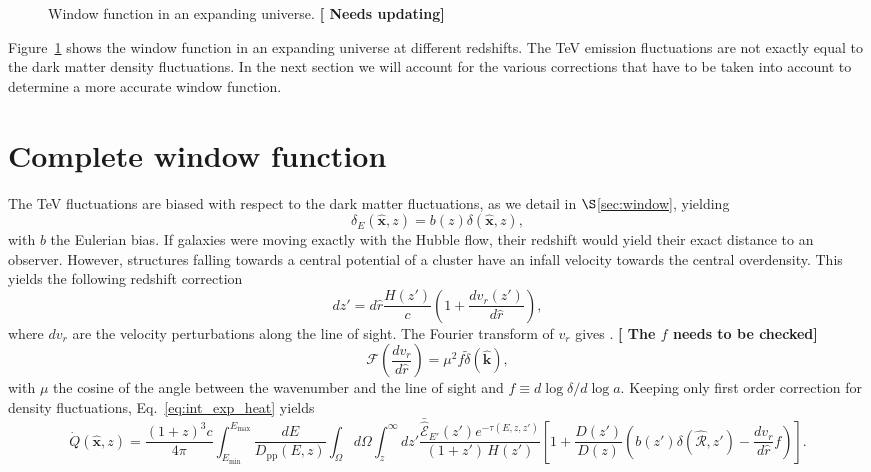 \documentclass[numberedappendix]{emulateapj}
\newcommand\ALc[1]{{\color{red} \bf #1}} %
\begin{document}
{\begin{figure}[h]
\caption{Window function in an expanding universe.\ALc{[{ Needs updating}]}}
\label{fig:window_nobiases}
\end{figure}
Figure~\ref{fig:window_nobiases} shows the window function in an expanding universe at different redshifts. %
The TeV emission fluctuations are not exactly equal to the dark matter density fluctuations. In the next section we will account for the various corrections that have to be taken into account to determine a more accurate window function.


\section{Complete window function}
\label{sec:window_complete}
The TeV fluctuations are biased with respect to the dark matter fluctuations, as we detail in $\S$\ref{sec:window}, yielding
\begin{equation}
\delta_E(\mathbf{\hat{x}},z)=b(z)\delta(\mathbf{\hat{x}},z),
\label{eq:bias}
\end{equation}
with $b$ the Eulerian bias. If galaxies were moving exactly with the Hubble flow, their redshift would yield their exact distance to an observer. However, structures falling towards a central potential of a cluster have an infall velocity towards the central overdensity. This yields the following redshift correction
\begin{equation}
\label{eq:vel_perturb}
dz'=d\hat r\frac{H(z')}{c}\left(1+\frac{dv_r(z')}{d\hat r}\right),
\end{equation}
where $dv_r$ are the velocity perturbations along the line of sight. The Fourier transform of $v_r$ gives \citep{1987MNRAS.227....1K}.\ALc{[{ The $f$ needs to be checked}]}
\begin{equation}
\label{eq:kaiser2}
\mathcal{F}\left(\frac{dv_r}{d\hat r}\right)=\mu^2 f \tilde{\delta}(\mathbf{\hat k}),
\end{equation}
with $\mu$ the cosine of the angle between the wavenumber and the line of sight and $f\equiv d\log\delta/d\log a$. Keeping only first order correction for density fluctuations, Eq.~\eqref{eq:int_exp_heat} yields
\begin{equation}
\label{eq:mean_heat0}
\dot{Q}(\mathbf{\hat{x}},z)=\frac{(1+z)^3c}{4\pi }\int_{E_{\mathrm{min}}}^{E_{\mathrm{max}}}\frac{dE}{D_{\mathrm{pp}}(E,z)}\int_{\Omega}d\Omega\int_z^{\infty} dz'\frac{\mathcal{\bar{\hat E}}_{E'}(z')e^{-\tau(E,z,z')}}{(1+z')\,H(z')}\left[1+\frac{D(z')}{D(z)}\left(b(z')\delta(\mathbf{\hat{\mathcal{R}}}, z') -\frac{dv_r}{d\hat r}f\right)\right].

\end{equation}}
\end{document}
